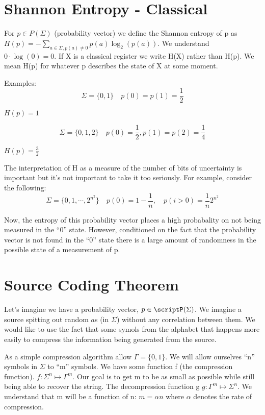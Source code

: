 \documentclass{article}
\begin{document}
\section{Shannon Entropy - Classical}
For $p \in P(\Sigma)$ (probability vector) we define the Shannon entropy
of p as $ H(p) = -\sum_{a\in \Sigma, p(a)\ne 0} p(a)\log_2(p(a)) $. We
understand $0\cdot \log(0) = 0$. If X is a classical register we write
H(X) rather than H(p). We mean H(p) for whatever p describes the state
of X at some moment.

Examples:
\[ 
        \Sigma = \{0,1\}\quad p(0) = p(1) = \frac{1}{2}
\]

$ H(p) = 1 $

\[ 
        \Sigma = \{0,1,2\}\quad p(0) = \frac{1}{2}, p(1)=p(2) = \frac{1}{4} 
\]

$H(p)=\frac{3}{2} $ 

The interpretation of H as a measure of the number of bits of
uncertainty is important but it's not important to take it too
seriously. For example, consider the following:
\[ 
        \Sigma = \{0,1,\cdots,2^{n^2}\}\quad p(0) = 1-\frac{1}{n},\quad
        p(i>0) =  \frac{1}{n}2^{n^2}
\]

Now, the entropy of this probability vector places a high probabality
on not being measured in the ``0'' state. However, conditioned on the
fact that the probability vector is not found in the ``0'' state there
is a large amount of randomness in the possible state of a measurement
of p.

\section{Source Coding Theorem}

Let's imagine we have a probability vector, $p \in \scriptP(\Sigma)$. We
imagine a source spitting out random $a$s (in $ \Sigma $) without any correlation
between them. We would like to use the fact that some symols from the
alphabet that happens more easily to compress the information being
generated from the source.

As a simple compression algorithm allow $ \Gamma = \{0,1\} $. We will
allow ourselves ``n'' symbols in $\Sigma$ to ``m'' symbols. We have some
function f (the compression function). $ f: \Sigma^n \mapsto \Gamma^m $.
Our goal is to get m to be as small as possible while still being able
to recover the string. The decompression function g $ g: \Gamma^m
\mapsto \Sigma^n $. We understand that m will be a function of n: $m =
\alpha n$ where $\alpha$ denotes the rate of compression.
\end{document}
